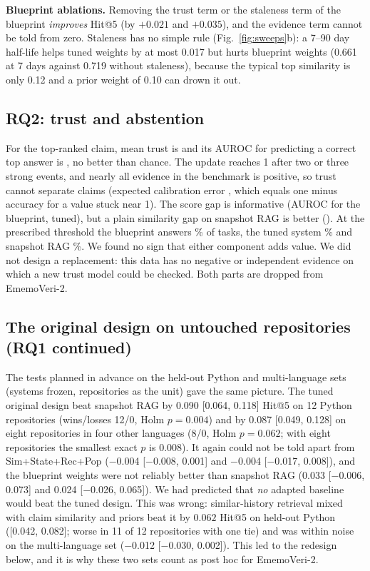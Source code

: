 \documentclass[runningheads]{llncs}
\newcommand{\sys}{EmemoVeri}
\begin{document}
\textbf{Blueprint ablations.} Removing the trust term or the staleness term of the blueprint \emph{improves} Hit@5 (by $+0.021$ and $+0.035$), and the evidence term cannot be told from zero. Staleness has no simple rule (Fig.~\ref{fig:sweeps}b): a 7--90 day half-life helps tuned weights by at most 0.017 but hurts blueprint weights (0.661 at 7 days against 0.719 without staleness), because the typical top similarity is only 0.12 and a prior weight of 0.10 can drown it out.

\subsection{RQ2: trust and abstention}
\label{sec:trust}
For the top-ranked claim, mean trust is \trustMean{} and its AUROC for predicting a correct top answer is \aurocTrustEmv{}, no better than chance. The update reaches 1 after two or three strong events, and nearly all evidence in the benchmark is positive, so trust cannot separate claims (expected calibration error \trustECE{}, which equals one minus accuracy for a value stuck near 1). The score gap is informative (AUROC \aurocGapEmv{} for the blueprint, \aurocGapTuned{} tuned), but a plain similarity gap on snapshot RAG is better (\aurocGapSnap{}). At the prescribed threshold the blueprint answers \covTwentyEmv{}\% of tasks, the tuned system \covTwentyTuned{}\% and snapshot RAG \covTwentySnap{}\%. We found no sign that either component adds value. We did not design a replacement: this data has no negative or independent evidence on which a new trust model could be checked. Both parts are dropped from \sys{}-2.

\subsection{The original design on untouched repositories (RQ1 continued)}
\label{sec:heldout}
The tests planned in advance on the held-out Python and multi-language sets (systems frozen, repositories as the unit) gave the same picture. The tuned original design beat snapshot RAG by 0.090 [0.064, 0.118] Hit@5 on 12 Python repositories (wins/losses 12/0, Holm $p=0.004$) and by 0.087 [0.049, 0.128] on eight repositories in four other languages (8/0, Holm $p=0.062$; with eight repositories the smallest exact $p$ is 0.008). It again could not be told apart from Sim+State+Rec+Pop ($-$0.004 [$-$0.008, 0.001] and $-$0.004 [$-$0.017, 0.008]), and the blueprint weights were not reliably better than snapshot RAG (0.033 [$-$0.006, 0.073] and 0.024 [$-$0.026, 0.065]). We had predicted that \emph{no} adapted baseline would beat the tuned design. This was wrong: similar-history retrieval mixed with claim similarity and priors beat it by $0.062$ Hit@5 on held-out Python ([0.042, 0.082]; worse in 11 of 12 repositories with one tie) and was within noise on the multi-language set ($-$0.012 [$-$0.030, 0.002]). This led to the redesign below, and it is why these two sets count as post hoc for \sys{}-2.
\end{document}
